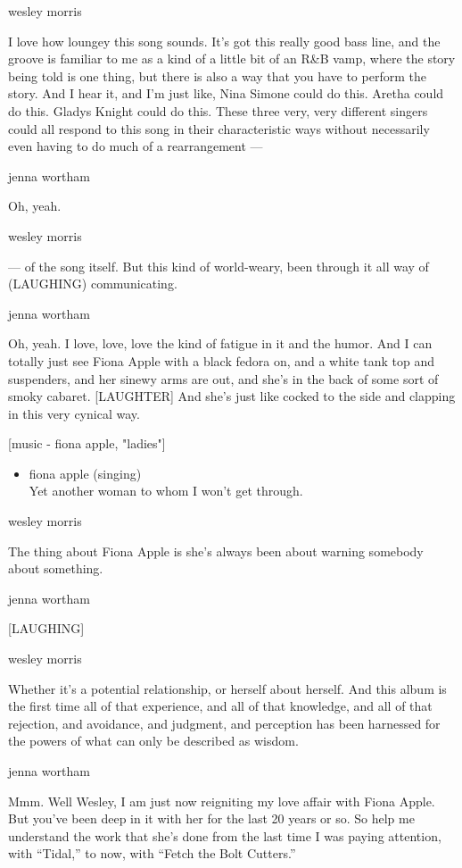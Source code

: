 wesley morris

I love how loungey this song sounds. It's got this really good bass
line, and the groove is familiar to me as a kind of a little bit of an
R\&B vamp, where the story being told is one thing, but there is also a
way that you have to perform the story. And I hear it, and I'm just
like, Nina Simone could do this. Aretha could do this. Gladys Knight
could do this. These three very, very different singers could all
respond to this song in their characteristic ways without necessarily
even having to do much of a rearrangement ---

jenna wortham

Oh, yeah.

wesley morris

--- of the song itself. But this kind of world-weary, been through it
all way of (LAUGHING) communicating.

jenna wortham

Oh, yeah. I love, love, love the kind of fatigue in it and the humor.
And I can totally just see Fiona Apple with a black fedora on, and a
white tank top and suspenders, and her sinewy arms are out, and she's in
the back of some sort of smoky cabaret. {[}LAUGHTER{]} And she's just
like cocked to the side and clapping in this very cynical way.

{[}music - fiona apple, "ladies"{]}

\begin{itemize}
\tightlist
\item
  fiona apple (singing)\\
  Yet another woman to whom I won't get through.
\end{itemize}

wesley morris

The thing about Fiona Apple is she's always been about warning somebody
about something.

jenna wortham

{[}LAUGHING{]}

wesley morris

Whether it's a potential relationship, or herself about herself. And
this album is the first time all of that experience, and all of that
knowledge, and all of that rejection, and avoidance, and judgment, and
perception has been harnessed for the powers of what can only be
described as wisdom.

jenna wortham

Mmm. Well Wesley, I am just now reigniting my love affair with Fiona
Apple. But you've been deep in it with her for the last 20 years or so.
So help me understand the work that she's done from the last time I was
paying attention, with ``Tidal,'' to now, with ``Fetch the Bolt
Cutters.''

